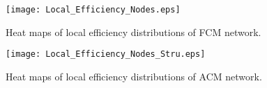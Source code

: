 \documentclass[12pt]{article}
\begin{document}
\begin{figure}[h!]
	\centering
	\texttt{[image: Local\_Efficiency\_Nodes.eps]}
	\caption{Heat maps of local efficiency distributions of FCM network.}
\end{figure}

\begin{figure}[h!]
	\centering
	\texttt{[image: Local\_Efficiency\_Nodes\_Stru.eps]}
	\caption{Heat maps of local efficiency distributions of ACM network.}
\end{figure}
\end{document}
